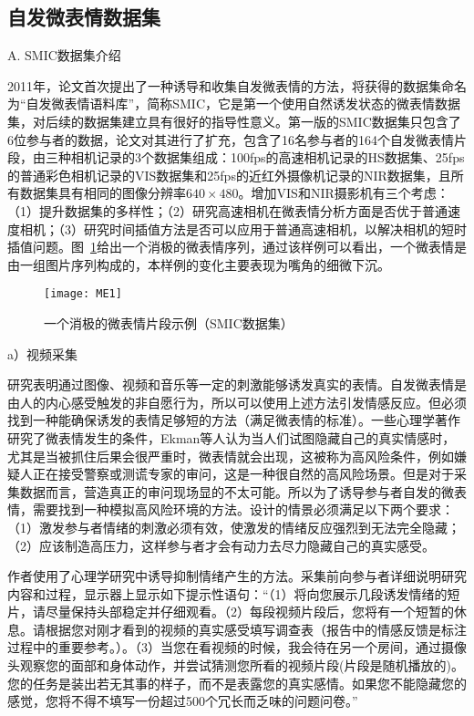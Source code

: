 \subsection{自发微表情数据集}

A. SMIC数据集介绍

2011年，论文首次提出了一种诱导和收集自发微表情的方法，将获得的数据集命名为“自发微表情语料库”，简称SMIC，它是第一个使用自然诱发状态的微表情数据集，对后续的数据集建立具有很好的指导性意义。第一版的SMIC数据集只包含了6位参与者的数据，论文对其进行了扩充，包含了16名参与者的164个自发微表情片段，由三种相机记录的3个数据集组成：100fps的高速相机记录的HS数据集、25fps的普通彩色相机记录的VIS数据集和25fps的近红外摄像机记录的NIR数据集，且所有数据集具有相同的图像分辨率$640\times480$。增加VIS和NIR摄影机有三个考虑：（1）提升数据集的多样性；（2）研究高速相机在微表情分析方面是否优于普通速度相机；（3）研究时间插值方法是否可以应用于普通高速相机，以解决相机的短时插值问题。图~\ref{fig2}给出一个消极的微表情序列，通过该样例可以看出，一个微表情是由一组图片序列构成的，本样例的变化主要表现为嘴角的细微下沉。
\begin{figure}[!htbp]
    \centering
    \texttt{[image: ME1]}
    \caption{一个消极的微表情片段示例（SMIC数据集）}
    \label{fig2}
\end{figure}

a）视频采集

研究表明通过图像、视频和音乐等一定的刺激能够诱发真实的表情\citep{Coan2015Handbook}。自发微表情是由人的内心感受触发的非自愿行为，所以可以使用上述方法引发情感反应。但必须找到一种能确保诱发的表情足够短的方法（满足微表情的标准）。一些心理学著作研究了微表情发生的条件，Ekman等人认为当人们试图隐藏自己的真实情感时，尤其是当被抓住后果会很严重时，微表情就会出现，这被称为高风险条件，例如嫌疑人正在接受警察或测谎专家的审问，这是一种很自然的高风险场景。但是对于采集数据而言，营造真正的审问现场显的不太可能。所以为了诱导参与者自发的微表情，需要找到一种模拟高风险环境的方法。设计的情景必须满足以下两个要求：（1）激发参与者情绪的刺激必须有效，使激发的情绪反应强烈到无法完全隐藏；（2）应该制造高压力，这样参与者才会有动力去尽力隐藏自己的真实感受。

作者使用了心理学研究中诱导抑制情绪产生的方法。采集前向参与者详细说明研究内容和过程，显示器上显示如下提示性语句：“（1）将向您展示几段诱发情绪的短片，请尽量保持头部稳定并仔细观看。（2）每段视频片段后，您将有一个短暂的休息。请根据您对刚才看到的视频的真实感受填写调查表（报告中的情感反馈是标注过程中的重要参考。）。（3）当您在看视频的时候，我会待在另一个房间，通过摄像头观察您的面部和身体动作，并尝试猜测您所看的视频片段(片段是随机播放的)。您的任务是装出若无其事的样子，而不是表露您的真实感情。如果您不能隐藏您的感觉，您将不得不填写一份超过500个冗长而乏味的问题问卷。”

